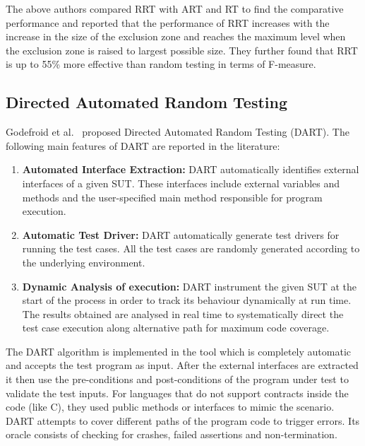 The above authors compared RRT with ART and RT to find the comparative performance and reported that the performance of RRT increases with the increase in the size of the exclusion zone and reaches the maximum level when the exclusion zone is raised to largest possible size. %
They further found that RRT is up to 55\% more effective than random testing in terms of F-measure.



\subsection{Directed Automated Random Testing}
Godefroid et al.~\cite{godefroid2005dart} proposed Directed Automated Random Testing (DART). %
The following main features of DART are reported in the literature:
\begin{enumerate}
\item {\bf Automated Interface Extraction:} DART automatically identifies external interfaces of a given SUT. These interfaces include external variables and methods and the user-specified main method responsible for program execution.
\item {\bf Automatic Test Driver:} DART automatically generate test drivers for running the test cases. All the test cases are randomly generated according to the underlying environment.
\item {\bf Dynamic Analysis of execution:} DART instrument the given SUT at the start of the process in order to track its behaviour dynamically at run time. The results obtained are analysed in real time to systematically direct the test case execution along alternative path for maximum code coverage.
\end{enumerate}

The DART algorithm is implemented in the tool which is completely automatic and accepts the test program as input. After the external interfaces are extracted it then use the pre-conditions and post-conditions of the program under test to validate the test inputs. For languages that do not support contracts inside the code (like C), they used public methods or interfaces to mimic the scenario. DART attempts to cover different paths of the program code to trigger errors. Its oracle consists of checking for crashes, failed assertions and non-termination.



